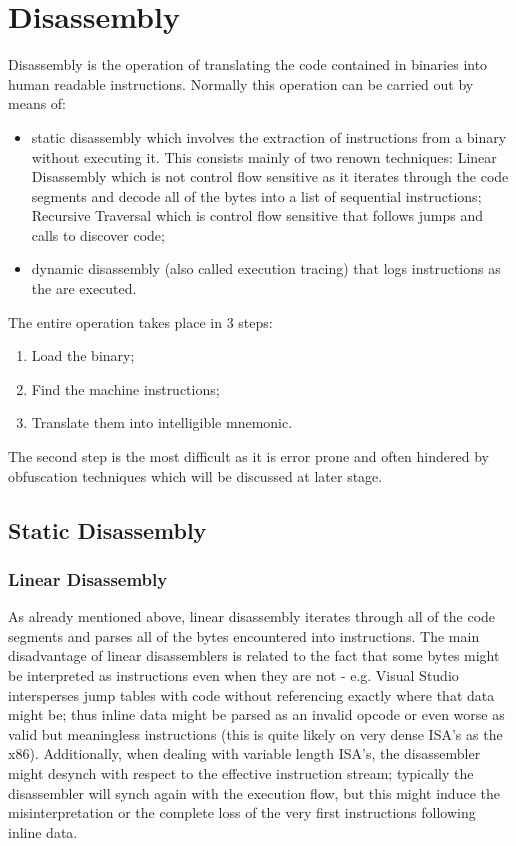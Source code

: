 \chapter{Disassembly}

Disassembly is the operation of translating the code contained in binaries into human readable instructions. Normally this operation can be carried out by means of:
\begin{itemize}
    \item static disassembly which involves the extraction of instructions from a binary without executing it. This consists mainly of two renown techniques:
        \subitem Linear Disassembly which is not control flow sensitive as it iterates through the code segments and decode all of the bytes into a list of sequential instructions;
        \subitem Recursive Traversal which is control flow sensitive that follows jumps and calls to discover code;
    \item dynamic disassembly (also called execution tracing) that logs instructions as the are executed.
\end{itemize}
The entire operation takes place in 3 steps:
\begin{enumerate}
    \item Load the binary;
    \item Find the machine instructions;
    \item Translate them into intelligible mnemonic.
\end{enumerate}
The second step is the most difficult as it is error prone and often hindered by obfuscation techniques which will be discussed at later stage.


\section{Static Disassembly}

\subsection{Linear Disassembly}
As already mentioned above, linear disassembly iterates through all of the code segments and parses all of the bytes encountered into instructions. The main disadvantage of linear disassemblers is related to the fact that some bytes might be interpreted as instructions even when they are not - e.g. Visual Studio intersperses jump tables with code without referencing exactly where that data might be; thus inline data might be parsed as an invalid opcode or even worse as valid but meaningless instructions (this is quite likely on very dense ISA's as the x86).
Additionally, when dealing with variable length ISA's, the disassembler might desynch with respect to the effective instruction stream; typically the disassembler will synch again with the execution flow, but this might induce the misinterpretation or the complete loss of the very first instructions following inline data.

